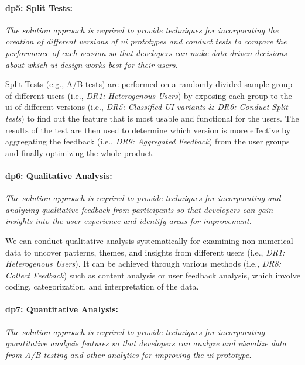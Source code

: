 \paragraph{\ac{dp}5: Split Tests:} \textit{The solution approach is required to provide techniques for incorporating the creation of different versions of \ac{ui} prototypes and conduct tests to compare the performance of each version so that developers can make data-driven decisions about which \ac{ui} design works best for their users.}

Split Tests (e.g., A/B tests) are performed on a randomly divided sample group of different users (i.e., \textit{DR1: Heterogenous Users}) by exposing each group to the \ac{ui} of different versions (i.e., \textit{DR5: Classified UI variants} \& \textit{DR6: Conduct Split tests}) to find out the feature that is most usable and functional for the users.
The results of the test are then used to determine which version is more effective by aggregating the feedback (i.e., \textit{DR9: Aggregated Feedback}) from the user groups and finally optimizing the whole product.


\paragraph{\ac{dp}6: Qualitative Analysis:} \textit{The solution approach is required to provide techniques for incorporating and analyzing qualitative feedback from participants so that developers can gain insights into the user experience and identify areas for improvement.}

We can conduct qualitative analysis systematically for examining non-numerical data to uncover patterns, themes, and insights from different users (i.e., \textit{DR1: Heterogenous Users}). 
It can be achieved through various methods (i.e., \textit{DR8: Collect Feedback}) such as content analysis or user feedback analysis, which involve coding, categorization, and interpretation of the data.

\paragraph{\ac{dp}7: Quantitative Analysis:} \textit{The solution approach is required to provide techniques for incorporating quantitative analysis features so that developers can analyze and visualize data from A/B testing and other analytics for improving the \ac{ui} prototype.}


